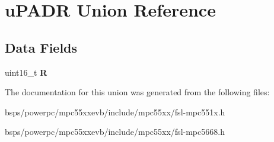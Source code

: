 \hypertarget{unionuPADR}{}\section{u\+P\+A\+DR Union Reference}
\label{unionuPADR}
\subsection*{Data Fields}
\begin{DoxyCompactItemize}
\item 
\mbox{\label{unionuPADR_adb450baab6b6e033facc5248e436dafc}} 
uint16\+\_\+t {\bfseries R}
\end{DoxyCompactItemize}


The documentation for this union was generated from the following files\+:\begin{DoxyCompactItemize}
\item 
bsps/powerpc/mpc55xxevb/include/mpc55xx/fsl-\/mpc551x.\+h\item 
bsps/powerpc/mpc55xxevb/include/mpc55xx/fsl-\/mpc5668.\+h\end{DoxyCompactItemize}
